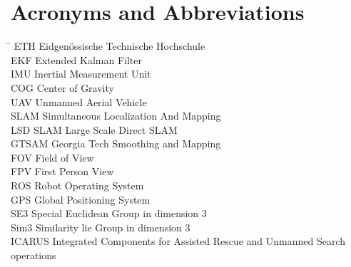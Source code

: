 \section*{Acronyms and Abbreviations}
\begin{tabbing}
 \hspace*{1.8cm}  \= \kill
 ETH \> Eidgenössische Technische Hochschule \\[0.5ex]
 EKF \> Extended Kalman Filter \\[0.5ex]
 IMU \> Inertial Measurement Unit \\[0.5ex]
 COG \> Center of Gravity \\[0.5ex]
 UAV \> Unmanned Aerial Vehicle \\[0.5ex]
 SLAM \> Simultaneous Localization And Mapping \\[0.5ex]
 LSD SLAM \> Large Scale Direct SLAM \\[0.5ex]
 GTSAM \> Georgia Tech Smoothing and Mapping \\[0.5ex]
 FOV \> Field of View \\[0.5ex]
 FPV \> First Person View \\[0.5ex]
 ROS \> Robot Operating System \\[0.5ex]
 GPS \> Global Positioning System \\[0.5ex]
 SE3 \> Special Euclidean Group in dimension 3\\[0.5ex]
 Sim3 \> Similarity lie Group in dimension 3\\[0.5ex]
 ICARUS \> Integrated Components for Assisted Rescue and Unmanned Search operations\\[0.5ex]
\end{tabbing}